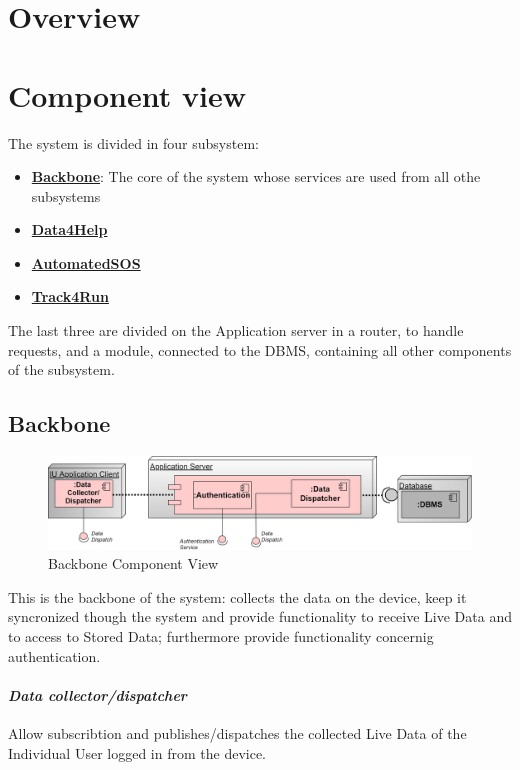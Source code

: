 \section{Overview}
\section{Component view}
The system is divided in four subsystem:
\begin{itemize}
\item \textbf{\href{subsect:backboneComponentView}{Backbone}}: The core of the system whose services are used from all othe subsystems
\item \textbf{\href{subsect:D4HComponentView}{Data4Help}}
\item \textbf{\href{subsect:ASOSComponentView}{AutomatedSOS}}
\item \textbf{\href{subsect:T4RComponentView}{Track4Run}}
\end{itemize}
The last three are divided on the Application server in a router, to handle requests, and a module, connected to the DBMS, containing all other components of the subsystem. 
\subsection{Backbone}
\label{subsect:backboneComponentView}
\begin{figure}[H]
\caption{Backbone Component View}
\includegraphics[width = \textwidth]{sections/architecturalDesign/BackboneDiagram.png}
\end{figure}
This is the backbone of the system: collects the data on the device, keep it syncronized though the system and provide functionality to receive Live Data and to access to Stored Data; furthermore provide functionality concernig authentication.
\paragraph{\textit{Data collector/dispatcher}} Allow subscribtion and publishes/dispatches the collected Live Data of the Individual User logged in from the device. 
